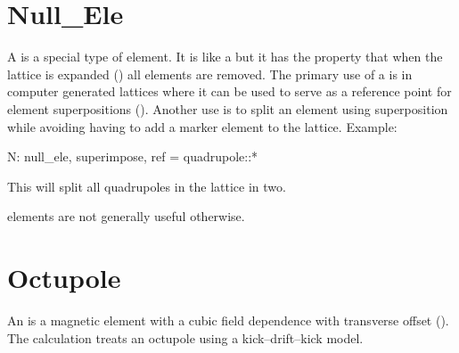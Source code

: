 {%
\section{Null_Ele}
\label{s:null.ele}

A  is a special type of element. It is like a  but it has the property that
when the lattice is expanded () all  elements are removed. The
primary use of a  is in computer generated lattices where it can be used to serve as a
reference point for element superpositions (). Another use is to split an element
using superposition while avoiding having to add a marker element to the lattice. Example:
\begin{example}
  N: null_ele, superimpose, ref = quadrupole::*
\end{example}
This will split all quadrupoles in the lattice in two.

 elements are not generally useful otherwise.


\newpage

\section{Octupole}
\label{s:oct}

An  is a magnetic element with a cubic field dependence
with transverse offset ().  The 
calculation treats an octupole using a kick--drift--kick model.

}
